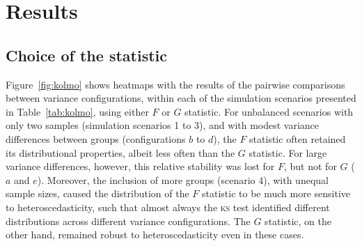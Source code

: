 \section{Results}

\subsection{Choice of the statistic}
\label{sec:results_statistic}

Figure~\ref{fig:kolmo} shows heatmaps with the results of the pairwise comparisons between variance configurations, within each of the simulation scenarios presented in Table~\ref{tab:kolmo}, using either $F$ or $G$ statistic. For unbalanced scenarios with only two samples (simulation scenarios 1 to 3), and with modest variance differences between groups (configurations $b$ to $d$), the $F$ statistic often retained its distributional properties, albeit less often than the $G$ statistic. For large variance differences, however, this relative stability was lost for $F$, but not for $G$ ($a$ and $e$). Moreover, the inclusion of more groups (scenario 4), with unequal sample sizes, caused the distribution of the $F$ statistic to be much more sensitive to heteroscedasticity, such that almost always the \textsc{ks} test identified different distributions across different variance configurations. The $G$ statistic, on the other hand, remained robust to heteroscedasticity even in these cases.

